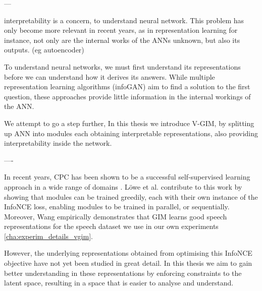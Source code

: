 ---

interpretability is a concern, to understand neural network. This problem has only become more relevant in recent years, as in representation learning for instance, not only are the internal works of the ANNs unknown, but also its outputs. (eg autoencoder)

To understand neural networks, we must first understand its representations before we can understand how it derives its answers. While multiple representation learning algorithms (infoGAN) aim to find a solution to the first question, these approaches provide little information in the internal workings of the ANN.

We attempt to go a step further,
In this thesis we introduce V-GIM, by splitting up ANN into modules each obtaining interpretable representations, also providing interpretability inside the network.

----


In recent years, CPC has been shown to be a successful self-supervised learning approach in a wide range of domains \citep{stackeEvaluationContrastivePredictive2020, dehaanContrastivePredictiveCoding2021, luSemiSupervisedHistologyClassification2019, bhatiSegmentalContrastivePredictive2021b, deldariTimeSeriesChange2021, henaffDataEfficientImageRecognition2020}. Löwe et al. contribute to this work by showing that modules can be trained greedily, each with their own instance of the InfoNCE loss, enabling modules to be trained in parallel, or sequentially. Moreover, Wang \citep{meihanwangSpeechRepresentationLearning2019} empirically demonstrates that GIM learns good speech representations for the speech dataset we use in our own experiments \ref{cha:experim_details_vgim}.

However, the underlying representations obtained from optimising this InfoNCE objective have not yet been studied in great detail. In this thesis we aim to gain better understanding in these representations by enforcing constraints to the latent space, resulting in a space that is easier to analyse and understand.








